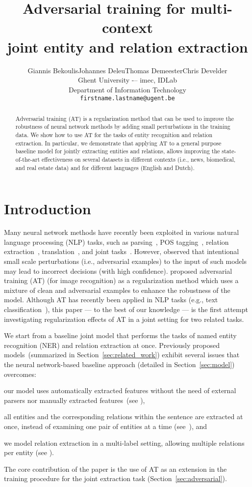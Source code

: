 \documentclass[11pt,a4paper]{article}
\title{Adversarial training for multi-context\\ 
joint entity and relation extraction}
\author{Giannis Bekoulis\qquad Johannes Deleu\qquad Thomas Demeester\qquad Chris Develder\\Ghent University -– imec, IDLab\\Department of Information Technology\\ \tt{firstname.lastname@ugent.be}}
\date{}
\newcommand{\ie}{i.e., }
\newcommand{\secref}[1]{Section~\ref{#1}}
\begin{document}
\maketitle
\begin{abstract}
Adversarial training (AT) is a regularization method that can be used to improve the robustness of neural network methods by adding small perturbations in the training data. We show how to use AT for the tasks of entity recognition and relation extraction. In particular, we demonstrate that applying AT to a general purpose baseline model for jointly extracting entities and relations, allows improving the state-of-the-art effectiveness on several datasets in different contexts (\ie news, biomedical, and real estate data) and for different languages (English and Dutch).

\end{abstract}

\section{Introduction}
Many neural network methods have recently been exploited in various natural language processing (NLP) tasks, such as parsing~\cite{zhang:16}, POS tagging~\cite{lample:16}, relation extraction~\cite{santos:15}, translation~\cite{bahdanau:14}, and joint tasks~\cite{miwa:16}. 
However,  observed that intentional small scale perturbations (\ie adversarial examples) to the input of such models may lead to incorrect decisions (with high confidence). 
 proposed adversarial training (AT) (for image recognition) as a regularization method which uses a mixture of clean and adversarial examples to enhance the robustness of the model. Although AT has recently been applied in NLP tasks (e.g., text classification~\cite{miyato:17}), this paper --- to the best of our knowledge --- is the first attempt  investigating regularization effects of AT in a joint setting for two related tasks.

We start from a baseline joint model that performs the tasks of named entity recognition (NER) and relation extraction at once. 
Previously proposed models~(summarized in \secref{sec:related_work}) exhibit several issues that the neural network-based baseline approach (detailed in \secref{sec:model}) overcomes:
\begin{enumerate*}[label=(\roman*)]
\item our model uses automatically extracted features without the need of external parsers nor manually extracted features~(see ),
\item all entities and the corresponding relations within the sentence are extracted at once, instead of examining one pair of entities at a time (see~), and
\item we model relation extraction in a multi-label setting, allowing multiple relations per entity (see ).
\end{enumerate*}
The core contribution of the paper is the use of AT
as an extension in the training procedure for the joint extraction task (\secref{sec:adversarial}).
\end{document}
